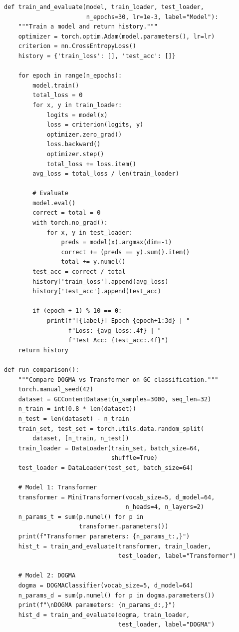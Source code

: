 \begin{lstlisting}[style=dogmapython, caption={Lab 7: Training loop and comparison.}]
def train_and_evaluate(model, train_loader, test_loader,
                       n_epochs=30, lr=1e-3, label="Model"):
    """Train a model and return history."""
    optimizer = torch.optim.Adam(model.parameters(), lr=lr)
    criterion = nn.CrossEntropyLoss()
    history = {'train_loss': [], 'test_acc': []}

    for epoch in range(n_epochs):
        model.train()
        total_loss = 0
        for x, y in train_loader:
            logits = model(x)
            loss = criterion(logits, y)
            optimizer.zero_grad()
            loss.backward()
            optimizer.step()
            total_loss += loss.item()
        avg_loss = total_loss / len(train_loader)

        # Evaluate
        model.eval()
        correct = total = 0
        with torch.no_grad():
            for x, y in test_loader:
                preds = model(x).argmax(dim=-1)
                correct += (preds == y).sum().item()
                total += y.numel()
        test_acc = correct / total
        history['train_loss'].append(avg_loss)
        history['test_acc'].append(test_acc)

        if (epoch + 1) % 10 == 0:
            print(f"[{label}] Epoch {epoch+1:3d} | "
                  f"Loss: {avg_loss:.4f} | "
                  f"Test Acc: {test_acc:.4f}")
    return history

def run_comparison():
    """Compare DOGMA vs Transformer on GC classification."""
    torch.manual_seed(42)
    dataset = GCContentDataset(n_samples=3000, seq_len=32)
    n_train = int(0.8 * len(dataset))
    n_test = len(dataset) - n_train
    train_set, test_set = torch.utils.data.random_split(
        dataset, [n_train, n_test])
    train_loader = DataLoader(train_set, batch_size=64,
                              shuffle=True)
    test_loader = DataLoader(test_set, batch_size=64)

    # Model 1: Transformer
    transformer = MiniTransformer(vocab_size=5, d_model=64,
                                  n_heads=4, n_layers=2)
    n_params_t = sum(p.numel() for p in
                     transformer.parameters())
    print(f"Transformer parameters: {n_params_t:,}")
    hist_t = train_and_evaluate(transformer, train_loader,
                                test_loader, label="Transformer")

    # Model 2: DOGMA
    dogma = DOGMAClassifier(vocab_size=5, d_model=64)
    n_params_d = sum(p.numel() for p in dogma.parameters())
    print(f"\nDOGMA parameters: {n_params_d:,}")
    hist_d = train_and_evaluate(dogma, train_loader,
                                test_loader, label="DOGMA")


\end{lstlisting}
